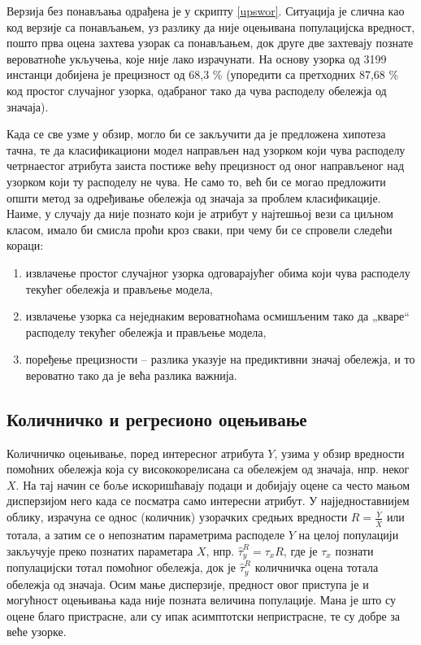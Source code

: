 \documentclass[a4paper]{article}
\begin{document}


Верзија без понављања одрађена је у скрипту \ref{upswor}. Ситуација је слична као код верзије са понављањем, уз разлику да није оцењивана популацијска вредност, пошто прва оцена захтева узорак са понављањем, док друге две захтевају познате вероватноће укључења, које није лако израчунати. На основу узорка од 3199 инстанци добијена је прецизност од 68,3 \% (упоредити са претходних 87,68 \% код простог случајног узорка, одабраног тако да чува расподелу обележја од значаја).



Када се све узме у обзир, могло би се закључити да је предложена хипотеза тачна, те да класификациони модел направљен над узорком који чува расподелу четрнаестог атрибута заиста постиже већу прецизност од оног направљеног над узорком који ту расподелу не чува. Не само то, већ би се могао предложити општи метод за одређивање обележја од значаја за проблем класификације. Наиме, у случају да није познато који је атрибут у најтешњој вези са циљном класом, имало би смисла проћи кроз сваки, при чему би се спровели следећи кораци:

\begin{enumerate}
\item извлачење простог случајног узорка одговарајућег обима који чува расподелу текућег обележја и прављење модела,
\item извлачење узорка са неједнаким вероватноћама осмишљеним тако да „кваре“ расподелу текућег обележја и прављење модела,
\item поређење прецизности -- разлика указује на предиктивни значај обележја, и то вероватно тако да је већа разлика важнија.
\end{enumerate}

\subsection{Количничко и регресионо оцењивање}

Количничко оцењивање, поред интересног атрибута $Y$, узима у обзир вредности помоћних обележја која су висококорелисана са обележјем од значаја, нпр. неког $X$.\cite{prez5} На тај начин се боље искоришћавају подаци и добијају оцене са често мањом дисперзијом него када се посматра само интересни атрибут. У најједноставнијем облику, израчуна се однос (количник) узорачких средњих вредности $R = \frac{\overline{Y}}{\overline{X}}$ или тотала, а затим се о непознатим параметрима расподеле $Y$ на целој популацији закључује преко познатих параметара $X$, нпр. $\hat{\tau}^R_y = \tau_x R$, где је $\tau_x$ познати популацијски тотал помоћног обележја, док је $\hat{\tau}^R_y$ количничка оцена тотала обележја од значаја. Осим мање дисперзије, предност овог приступа је и могућност оцењивања када није позната величина популације. Мана је што су оцене благо пристрасне, али су ипак асимптотски непристрасне, те су добре за веће узорке.\cite{cochran}
\end{document}

